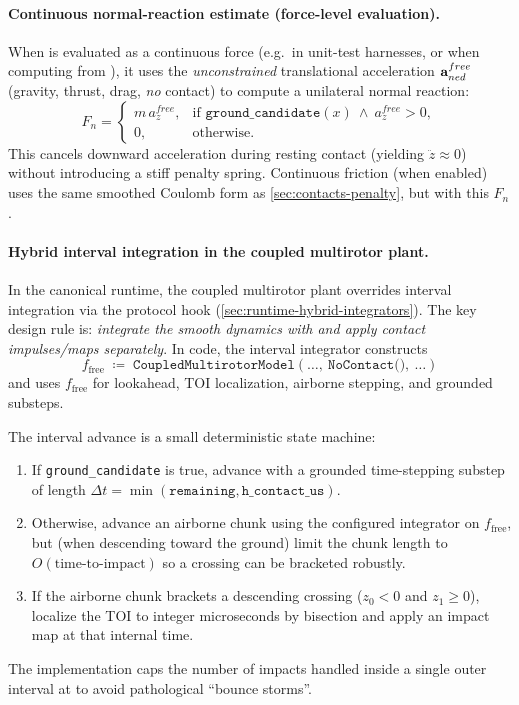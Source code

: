 \paragraph{Continuous normal-reaction estimate (force-level evaluation).}
When  is evaluated as a continuous force (e.g.\ in unit-test harnesses, or when computing  from ), it uses the \emph{unconstrained} translational acceleration \( \mathbf{a}^{free}_{ned}\) (gravity, thrust, drag, \emph{no} contact) to compute a unilateral normal reaction:
\begin{equation}
  F_n =
  \begin{cases}
    m\,a^{free}_{z}, & \text{if } \texttt{ground\_candidate}(x)\ \wedge\ a^{free}_{z}>0,\\
    0, & \text{otherwise}.
  \end{cases}
\end{equation}
This cancels downward acceleration during resting contact (yielding \(\ddot{z}\approx 0\)) without introducing a stiff penalty spring. Continuous friction (when enabled) uses the same smoothed Coulomb form as \cref{sec:contacts-penalty}, but with this \(F_n\).

\paragraph{Hybrid interval integration in the coupled multirotor plant.}
In the canonical runtime, the coupled multirotor plant overrides interval integration via the protocol hook  (\cref{sec:runtime-hybrid-integrators}). The key design rule is: \emph{integrate the smooth dynamics with  and apply contact impulses/maps separately}. In code, the interval integrator constructs
\begin{equation}
  f_{\mathrm{free}} \;\coloneqq\; \texttt{CoupledMultirotorModel}(\ldots,\ \texttt{NoContact()},\ \ldots)
\end{equation}
and uses \(f_{\mathrm{free}}\) for lookahead, TOI localization, airborne stepping, and grounded substeps.

The interval advance is a small deterministic state machine:
\begin{enumerate}[leftmargin=*,itemsep=2pt]
  \item If \texttt{ground\_candidate} is true, advance with a grounded time-stepping substep of length \(\Delta t = \min(\texttt{remaining},\texttt{h\_contact\_us})\).
  \item Otherwise, advance an airborne chunk using the configured integrator on \(f_{\mathrm{free}}\), but (when descending toward the ground) limit the chunk length to \(O(\text{time-to-impact})\) so a crossing can be bracketed robustly.
  \item If the airborne chunk brackets a descending crossing (\(z_0<0\) and \(z_1\ge 0\)), localize the TOI to integer microseconds by bisection and apply an impact map at that internal time.
\end{enumerate}
The implementation caps the number of impacts handled inside a single outer interval at  to avoid pathological ``bounce storms''.

